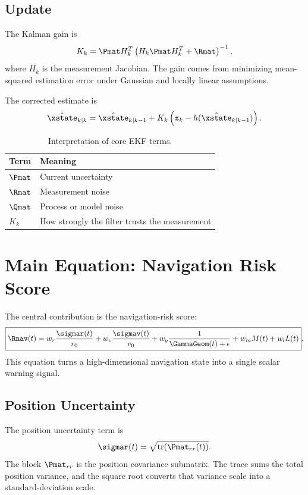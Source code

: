 \documentclass[11pt]{article}
\begin{document}
\subsection{Update}

The Kalman gain is
\begin{equation}
  K_k
  =
  \Pmat H_k^{T}
  \left(
    H_k \Pmat H_k^{T} + \Rmat
  \right)^{-1},
\end{equation}
where $H_k$ is the measurement Jacobian. The gain comes from minimizing
mean-squared estimation error under Gaussian and locally linear assumptions.

The corrected estimate is
\begin{equation}
  \hat{\xstate}_{k|k}
  =
  \hat{\xstate}_{k|k-1}
  +
  K_k
  \left(
    \bm{z}_k - h(\hat{\xstate}_{k|k-1})
  \right).
\end{equation}

\begin{table}[h]
\centering
\begin{tabular}{ll}
\toprule
Term & Meaning\\
\midrule
$\Pmat$ & Current uncertainty\\
$\Rmat$ & Measurement noise\\
$\Qmat$ & Process or model noise\\
$K_k$ & How strongly the filter trusts the measurement\\
\bottomrule
\end{tabular}
\caption{Interpretation of core EKF terms.}
\end{table}

\section{Main Equation: Navigation Risk Score}

The central contribution is the navigation-risk score:
\begin{equation}
\boxed{
\Rnav(t)
=
w_r\frac{\sigmar(t)}{r_0}
+
w_v\frac{\sigmav(t)}{v_0}
+
w_g\frac{1}{\GammaGeom(t)+\epsilon}
+
w_mM(t)
+
w_lL(t)
}.
\end{equation}
This equation turns a high-dimensional navigation state into a single scalar
warning signal.

\subsection{Position Uncertainty}

The position uncertainty term is
\begin{equation}
  \sigmar(t) = \sqrt{\operatorname{tr}(\Pmat_{rr}(t))}.
\end{equation}
The block $\Pmat_{rr}$ is the position covariance submatrix. The trace sums
the total position variance, and the square root converts that variance scale
into a standard-deviation scale.
\end{document}
